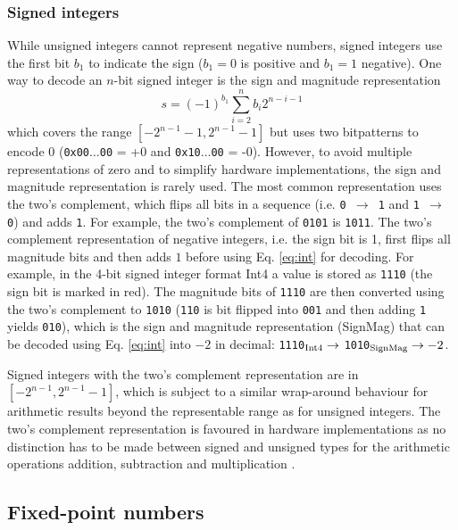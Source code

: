 \subsubsection{Signed integers}
\label{sec:int}

While unsigned integers cannot represent negative numbers, signed integers use the first bit $b_1$ to indicate the sign ($b_1 = 0$ is
positive and $b_1 = 1$ negative). One way to decode an $n$-bit signed integer is the sign and magnitude representation
\begin{equation}
	s = (-1)^{b_1}\sum_{i=2}^{n} b_i 2^{n-i-1}
	\label{eq:int}
\end{equation}
which covers the range $[-2^{n-1}-1,2^{n-1}-1]$ but uses two bitpatterns to encode 0 (\texttt{0x00$\dots$00} = +0 and \texttt{0x10$\dots$00} = -0).
However, to avoid multiple representations of zero and to simplify hardware implementations, the sign and magnitude representation
is rarely used. The most common representation uses the two's complement, which flips all bits in a sequence (i.e. \texttt{0 $\to$ 1} and \texttt{1 $\to$ 0})
and adds \texttt{1}. For example, the two's complement of \texttt{0101} is \texttt{1011}. The two's complement representation of negative
integers, i.e. the sign bit is 1, first flips all magnitude bits and then adds $1$ before using Eq. \ref{eq:int} for decoding. For example,
in the 4-bit signed integer format Int4 a value is stored as \texttt{{\color{psign}1}110} (the sign bit is marked in red). The magnitude bits of
\texttt{{\color{psign}1}110} are then converted using the two's complement to \texttt{{\color{psign}1}010} (\texttt{110} is bit flipped into \texttt{001}
and then adding \texttt{1} yields \texttt{010}), which is the sign and magnitude representation (SignMag) that can be decoded using Eq. \ref{eq:int}
into $-2$ in decimal: \texttt{{\color{psign}1}110}$_{\operatorname{Int4}} \to$ \texttt{{\color{psign}1}010}$_{\operatorname{SignMag}} \to -2$. 

Signed integers with the two's complement representation are in $[-2^{n-1},2^{n-1}-1]$, which is subject to a similar wrap-around behaviour 
for arithmetic results beyond the representable range as for unsigned integers. The two's complement representation
is favoured in hardware implementations as no distinction has to be made between signed and unsigned types for the
arithmetic operations addition, subtraction and multiplication \citep{Choo2003}.

\subsection{Fixed-point numbers}
\label{sec:fixpoints}

